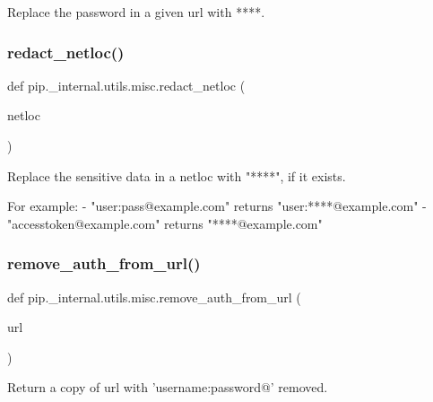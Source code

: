 \begin{DoxyVerb}Replace the password in a given url with ****.\end{DoxyVerb}
 \mbox{\label{namespacepip_1_1__internal_1_1utils_1_1misc_aac092fd7cd598e5515b827d32a45e530}} 
\subsubsection{\texorpdfstring{redact\+\_\+netloc()}{redact\_netloc()}}
{\footnotesize\ttfamily def pip.\+\_\+internal.\+utils.\+misc.\+redact\+\_\+netloc (\begin{DoxyParamCaption}\item[{}]{netloc }\end{DoxyParamCaption})}

\begin{DoxyVerb}Replace the sensitive data in a netloc with "****", if it exists.

For example:
    - "user:pass@example.com" returns "user:****@example.com"
    - "accesstoken@example.com" returns "****@example.com"
\end{DoxyVerb}
 \mbox{\label{namespacepip_1_1__internal_1_1utils_1_1misc_ab86409360d3b9ff8c6e22c43783244f9}} 
\subsubsection{\texorpdfstring{remove\+\_\+auth\+\_\+from\+\_\+url()}{remove\_auth\_from\_url()}}
{\footnotesize\ttfamily def pip.\+\_\+internal.\+utils.\+misc.\+remove\+\_\+auth\+\_\+from\+\_\+url (\begin{DoxyParamCaption}\item[{}]{url }\end{DoxyParamCaption})}

\begin{DoxyVerb}Return a copy of url with 'username:password@' removed.\end{DoxyVerb}
 \mbox{\label{namespacepip_1_1__internal_1_1utils_1_1misc_ab071641ac0c920b213505c5ca553097f}} 
